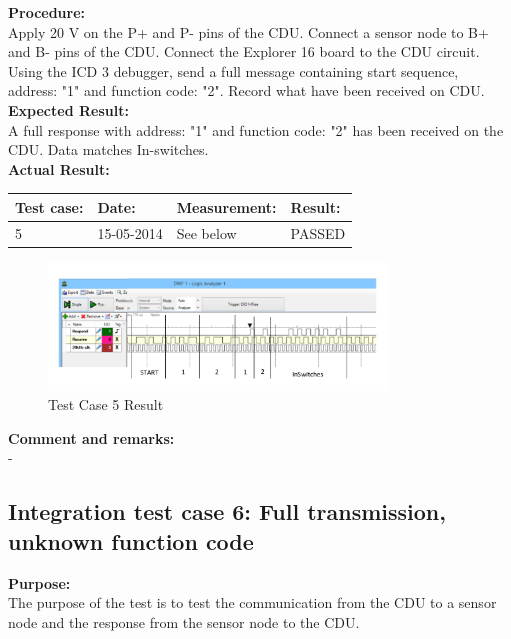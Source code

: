 \textbf{Procedure:}\\
Apply 20 V on the P+ and P- pins of the CDU. Connect a sensor node to B+ and B- pins of the CDU. Connect the Explorer 16 board to the CDU circuit. Using the ICD 3 debugger, send a full message containing start sequence, address: "1" and function code: "2". Record what have been received on CDU.\\

\textbf{Expected Result:}\\
A full response with address: "1" and function code: "2" has been received on the CDU. Data matches In-switches.\\

\textbf{Actual Result:}\\
\begin{table}[H]
\centering
\begin{tabular}{|p{2cm}|p{2cm}|p{3cm}|p{2cm}|}\hline
\textbf{Test case:} & \textbf{Date:} & \textbf{Measurement:} & \textbf{Result:} \\ \hline
5 & 15-05-2014 & See below & PASSED \\ \hline
\end{tabular}
\end{table}

\begin{figure}[H]
\centering
\includegraphics[width=0.8\textwidth]{billeder/intetestcase5}
\caption{Test Case 5 Result}
\label{fig:InteTestCase5}
\end{figure}


\textbf{Comment and remarks:}\\
-\\

\subsection{Integration test case 6: Full transmission, unknown function code}
\textbf{Purpose:}\\
The purpose of the test is to test the communication from the CDU to a sensor node and the response from the sensor node to the CDU.\\

